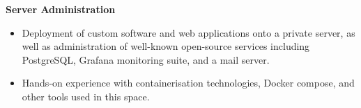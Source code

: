 \documentclass[10pt, a4paper]{article}
\newenvironment{highlights}{
    \begin{itemize}[
        topsep=0.08 cm,
        parsep=0.05 cm,
        partopsep=0pt,
        itemsep=0pt,
        leftmargin=0.4 cm + 10pt
    ]
}{
    \end{itemize}
} %
\newenvironment{twocolentry}[2][]{
    \onecolentry
    \def\secondColumn{#2}
    \setcolumnwidth{\fill, 4.2 cm}
    \begin{paracol}{2}
}{
    \switchcolumn \raggedleft \secondColumn
    \end{paracol}
    \endonecolentry
} %
\begin{document}
        \vspace{0.2 cm}

        \begin{twocolentry}{
             
        }
            \textbf{Server Administration}
            \begin{highlights}
                \item Deployment of custom software and web applications onto a private server, as well as administration of well-known open-source services including PostgreSQL, Grafana monitoring suite, and a mail server.
                \item Hands-on experience with containerisation technologies, Docker compose, and other tools used in this space.
            \end{highlights}
        \end{twocolentry}



    
\end{document}
